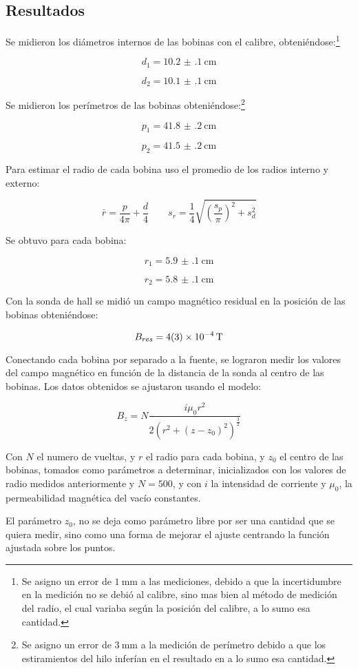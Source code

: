 \documentclass[12pt,a4paper]{article}
\begin{document}
\subsection*{Resultados}
Se midieron los diámetros internos de las bobinas con el calibre, obteniéndose:\footnote{Se asigno un error de $\SI{1}{\milli\meter}$ a las mediciones, debido a que la incertidumbre en la medición no se debió al calibre, sino mas bien al método de medición del radio, el cual variaba según la posición del calibre, a lo sumo esa cantidad.}

$$d_1 = \SI{10.2(1)}{\centi\meter}$$

$$d_2 = \SI{10.1(1)}{\centi\meter}$$


Se midieron los perímetros de las bobinas obteniéndose:\footnote{Se asigno un error de $\SI{3}{\milli\meter}$ a la medición de perímetro debido a que los estiramientos del hilo inferían en el resultado en a lo sumo esa cantidad.}

$$p_1 = \SI{41.8(2)}{\centi\meter}$$

$$p_2 = \SI{41.5(2)}{\centi\meter}$$

Para estimar el radio de cada bobina uso el promedio de los radios interno y externo:

$$ \bar{r} = \frac{p}{4\pi} + \frac{d}{4} \qquad s_r = \frac{1}{4} \sqrt{\left(\frac{s_p}{\pi}\right)^2 + s_d^2 }$$

Se obtuvo para cada bobina:

$$r_1 = \SI{5.9(1)}{\centi\meter}$$

$$r_2 = \SI{5.8(1)}{\centi\meter}$$

Con la sonda de hall se midió un campo magnético residual en la posición de las bobinas obteniéndose:

$$B_{res} = \SI{4(3)d-4}{\tesla}$$

Conectando cada bobina por separado a la fuente, se lograron medir los valores del campo magnético en función de la distancia de la sonda al centro de las bobinas. Los datos obtenidos se ajustaron usando el modelo:

$$ B_z = N\frac{i \mu_0r^2 }{2(r^2 + (z-z_0)^2)^{\frac{3}{2}}} $$

 Con $N$ el numero de vueltas, y $r$ el radio para cada bobina, y $z_0$ el centro de las bobinas, tomados como parámetros a determinar, inicializados con los valores de radio medidos anteriormente y $N = 500$, y con $i$ la intensidad de corriente y $\mu_0$, la permeabilidad magnética del vacío constantes.
 
 El parámetro $z_0$, no se deja como parámetro libre por ser una cantidad que se quiera medir, sino como una forma de mejorar el ajuste centrando la función ajustada sobre los puntos. 
\end{document}
